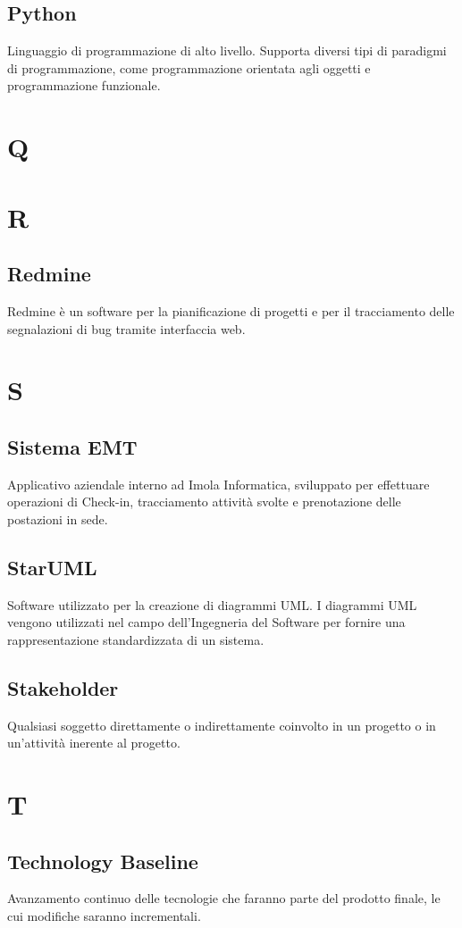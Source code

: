 \subsection{Python}
Linguaggio di programmazione di alto livello. Supporta diversi tipi di paradigmi di programmazione, come programmazione
orientata agli oggetti e programmazione funzionale.
\newpage
\section{Q}
\section{R}
\subsection{Redmine}
Redmine è un software per la pianificazione di progetti e per il tracciamento delle segnalazioni di bug tramite interfaccia web.
\newpage
\section{S}
\subsection{Sistema EMT}
Applicativo aziendale interno ad Imola Informatica, sviluppato per effettuare operazioni di Check-in, tracciamento attività svolte e prenotazione delle postazioni in sede.
\subsection{StarUML}
Software utilizzato per la creazione di diagrammi UML. I diagrammi UML vengono utilizzati nel campo dell'Ingegneria del Software per fornire una rappresentazione standardizzata di un sistema.
\subsection{Stakeholder}
Qualsiasi soggetto direttamente o indirettamente coinvolto in un progetto o in un'attività inerente al progetto.
\newpage
\section{T}
\subsection{Technology Baseline}
Avanzamento continuo delle tecnologie che faranno parte del prodotto finale, le cui modifiche saranno incrementali.
